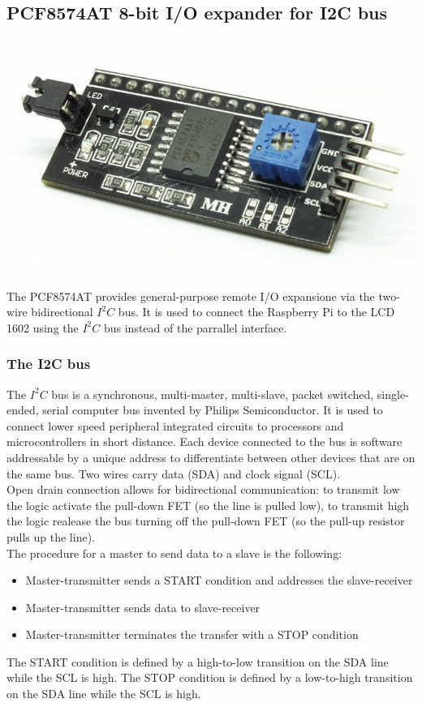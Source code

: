 \documentclass[]{article}
\begin{document}
\subsection{PCF8574AT 8-bit I/O expander for I2C bus}
\begin{center}
    \includegraphics[scale=0.2]{io_expander}
\end{center}
The PCF8574AT provides general-purpose remote I/O expansione via the two-wire bidirectional $ I^2C $ bus. It is used to connect the Raspberry Pi to the LCD 1602
using the $ I^2 C $ bus instead of the parrallel interface.

\subsubsection{The I2C bus}
The $ I^2C $ bus is a synchronous, multi-master, multi-slave, packet switched, single-ended, serial computer bus invented by Philips Semiconductor.
It is used to connect lower speed peripheral integrated circuits to processors and microcontrollers in short distance. 
Each device connected to the bus is software addressable by a unique address to differentiate between other devices that are on the same bus. 
Two wires carry data (SDA) and clock signal (SCL). \\
Open drain connection allows for bidirectional communication: to transmit low the logic activate the pull-down FET (so the line is pulled low), 
to transmit high the logic realease the bus turning off the pull-down FET (so the pull-up resistor pulls up the line). \\
The procedure for a master to send data to a slave is the following: 
\begin{itemize}
    \item Master-transmitter sends a START condition and addresses the slave-receiver 
    \item Master-transmitter sends data to slave-receiver 
    \item Master-transmitter terminates the transfer with a STOP condition 
\end{itemize}
The START condition is defined by a high-to-low transition on the SDA line while the SCL is high. The STOP condition is defined by a low-to-high transition 
on the SDA line while the SCL is high.
\end{document}
